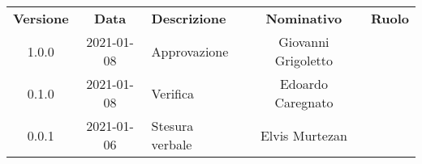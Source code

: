 {
    \renewcommand{\arraystretch}{1.5}
    \centering
    \begin{longtable}{ c c  C{4cm}  c  c }
        \rowcolor{\primaryColor}
        \textcolor{\secondaryColor}{
        \textbf{Versione}}     & \textcolor{\secondaryColor}{\textbf{Data}}       & \textcolor{\secondaryColor}
        {\textbf{Descrizione}} & \textcolor{\secondaryColor}{\textbf{Nominativo}} & \textcolor{\secondaryColor}{\textbf{Ruolo}}                          \\


        1.0.0                  & 2021-01-08                                       & Approvazione                                & Giovanni Grigoletto & \responsabile{} \\
        0.1.0                  & 2021-01-08                                       & Verifica                                    & Edoardo Caregnato & \verificatore{} \\
        0.0.1                  & 2021-01-06                                       & Stesura verbale                           & Elvis Murtezan & \redattore{}    \\
    \end{longtable}
}